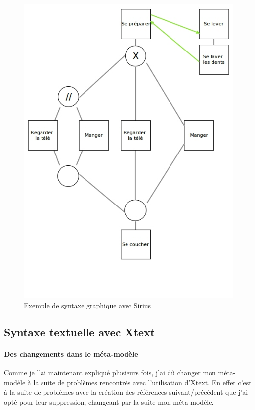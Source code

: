 \documentclass[12pt]{article}
\begin{document}
\begin{figure}
	\begin{center}
		\includegraphics[width=\textwidth]{figures/sirius.png}
		\caption{Exemple de syntaxe graphique avec Sirius}
		\label{Sirius}
	\end{center}
\end{figure}

\subsection{Syntaxe textuelle avec Xtext}
\paragraph{Des changements dans le méta-modèle}
Comme je l'ai maintenant expliqué plusieurs fois, j'ai dû changer mon méta-modèle à la suite de problèmes rencontrés avec l'utilisation d'Xtext. En effet c'est à la suite de problèmes avec la création des références suivant/précédent que j'ai opté pour leur suppression, changeant par la suite mon méta modèle.
\end{document}
